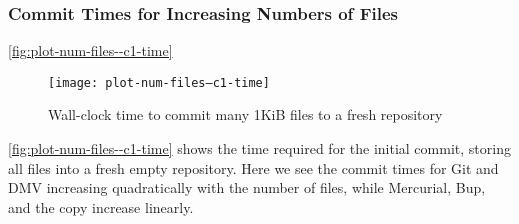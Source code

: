 %


\subsubsection{Commit Times for Increasing Numbers of Files}

\autoref{fig:plot-num-files--c1-time}

\begin{figure}[p]
    \caption{Wall-clock time to commit many 1KiB files to a fresh repository}
    \label{fig:plot-num-files--c1-time}
    \centering

    \explainlogsubfig

    \texttt{[image: plot-num-files--c1-time]}
\end{figure}

\autoref{fig:plot-num-files--c1-time} shows the time required for the initial \gls{commit}, storing all files into a fresh empty \gls{repository}.
Here we see the commit times for Git and DMV increasing quadratically with the number of files, while Mercurial, Bup, and the copy increase linearly.
